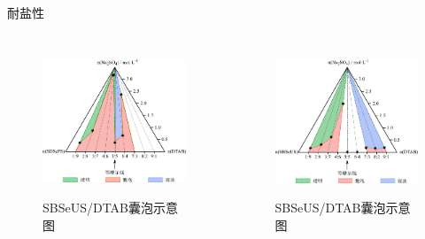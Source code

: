 \documentclass[10pt,aspectratio=43,mathserif]{beamer}
\begin{document}
\begin{frame}{耐盐性}
    \begin{columns}[c]
        \begin{figure}[htbp]
            \centering
            \includegraphics[width=0.92\linewidth]{figure/SDSePS-salt.pdf}\\
            \caption{SBSeUS/DTAB囊泡示意图}\label{fig:SDSePS-salt}
        \end{figure}
    
        \begin{figure}[htbp]
            \centering
            \includegraphics[width=0.92\linewidth]{figure/SBSeUS-salt.pdf}\\
            \caption{SBSeUS/DTAB囊泡示意图}\label{fig:SBSeUS-salt}
        \end{figure}
    
    \end{columns}
\end{frame}
\end{document}
